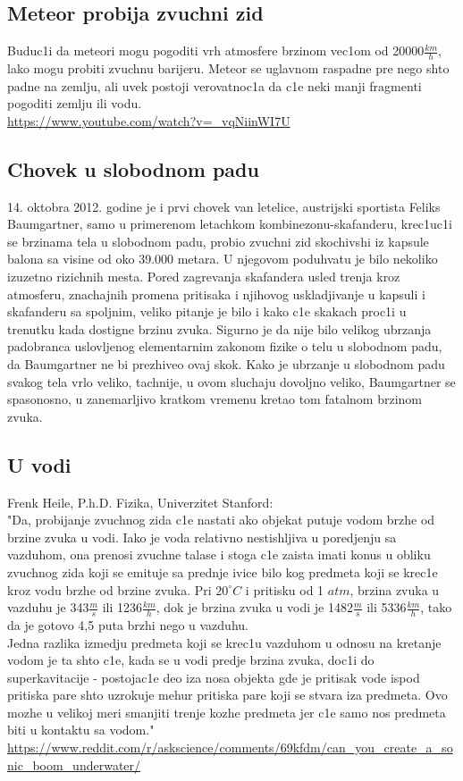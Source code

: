 \documentclass[11pt]{article}
\newcommand\eng{\fontencoding{OT1}\fontfamily{\rmdefault}\selectfont}
\newcommand\srb{\fontencoding{OT2}\fontfamily{\rmdefault}\selectfont}
\begin{document}
\subsection{Meteor probija zvuchni zid}
Buduc1i da meteori mogu pogoditi vrh atmosfere brzinom vec1om od 20000$\frac{km}{h}$, lako mogu probiti zvuchnu barijeru. Meteor se uglavnom raspadne pre nego shto padne na zemlju, ali uvek postoji verovatnoc1a da c1e neki manji fragmenti pogoditi zemlju ili vodu.\\
\eng\url{https://www.youtube.com/watch?v=_vqNiinWI7U}\srb

\subsection{Chovek u slobodnom padu}
14. oktobra 2012. godine je i prvi chovek van letelice, austrijski sportista Feliks Baumgartner, samo u primerenom letachkom kombinezonu-skafanderu, krec1uc1i se brzinama tela u slobodnom padu, probio zvuchni zid skochivshi iz kapsule balona sa visine od oko 39.000 metara. U njegovom poduhvatu je bilo nekoliko izuzetno rizichnih mesta. Pored zagrevanja skafandera usled trenja kroz atmosferu, znachajnih promena pritisaka i njihovog uskladjivanje u kapsuli i skafanderu sa spoljnim, veliko pitanje je bilo i kako c1e skakach proc1i u trenutku kada dostigne brzinu zvuka. Sigurno je da nije bilo velikog ubrzanja padobranca uslovljenog elementarnim zakonom fizike o telu u slobodnom padu, da Baumgartner ne bi prezhiveo ovaj skok. Kako je ubrzanje u slobodnom padu svakog tela vrlo veliko, tachnije, u ovom sluchaju dovoljno veliko, Baumgartner se spasonosno, u zanemarljivo kratkom vremenu kretao tom fatalnom brzinom zvuka.

\subsection{U vodi}
Frenk Heile, \eng P.h.D.\srb{} Fizika, Univerzitet Stanford:\\

"Da, probijanje zvuchnog zida c1e nastati ako objekat putuje vodom brzhe od brzine zvuka u vodi. Iako je voda relativno nestishljiva u poredjenju sa vazduhom, ona prenosi zvuchne talase i stoga c1e zaista imati konus u obliku zvuchnog zida koji se emituje sa prednje ivice bilo kog predmeta koji se krec1e kroz vodu brzhe od brzine zvuka. Pri $20^{\circ} C$ i pritisku od 1 $atm$, brzina zvuka u vazduhu je 343$\frac{m}{s}$ ili 1236$\frac{km}{h}$, dok je brzina zvuka u vodi je 1482$\frac{m}{s}$ ili 5336$\frac{km}{h}$, tako da je gotovo 4,5 puta brzhi nego u vazduhu.\\

Jedna razlika izmedju predmeta koji se krec1u vazduhom u odnosu na kretanje vodom je ta shto c1e, kada se u vodi predje brzina zvuka, doc1i do superkavitacije - postojac1e deo iza nosa objekta gde je pritisak vode ispod pritiska pare shto uzrokuje mehur pritiska pare koji se stvara iza predmeta. Ovo mozhe u velikoj meri smanjiti trenje kozhe predmeta jer c1e samo nos predmeta biti u kontaktu sa vodom."\\

\eng\url{https://www.reddit.com/r/askscience/comments/69kfdm/can_you_create_a_sonic_boom_underwater/}\srb
\end{document}
